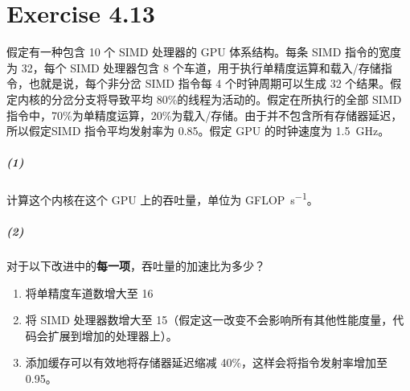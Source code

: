 \documentclass{article}
\begin{document}
\section{Exercise 4.13}
假定有一种包含 10 个 SIMD 处理器的 GPU 体系结构。每条 SIMD 指令的宽度为 32，每个 SIMD 处理器包含 8 个车道，用于执行单精度运算和载入/存储指令，也就是说，每个非分岔 SIMD 指令每 4 个时钟周期可以生成 32 个结果。假定内核的分岔分支将导致平均 80\%的线程为活动的。假定在所执行的全部 SIMD 指令中，70\%为单精度运算，20\%为载入/存储。由于并不包含所有存储器延迟，所以假定SIMD 指令平均发射率为 0.85。假定 GPU 的时钟速度为 \SI{1.5}{\giga\hertz}。
\subparagraph{(1)} 计算这个内核在这个 GPU 上的吞吐量，单位为 \si{GFLOP\per\second}。
\subparagraph{(2)} 对于以下改进中的\textbf{每一项}，吞吐量的加速比为多少？
\begin{enumerate}[leftmargin = .2\linewidth, rightmargin = .2\linewidth, label=\textcircled{\arabic*}]
    \item 将单精度车道数增大至 16
    \item 将 SIMD 处理器数增大至 15（假定这一改变不会影响所有其他性能度量，代码会扩展到增加的处理器上）。
    \item 添加缓存可以有效地将存储器延迟缩减 40\%，这样会将指令发射率增加至0.95。
\end{enumerate}
\end{document}
